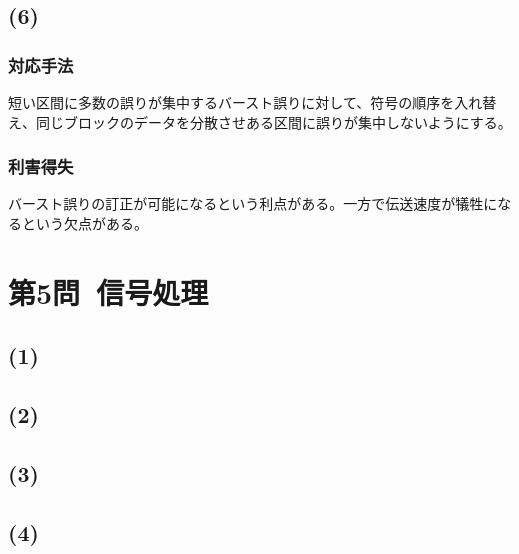 \documentclass[a4paper,12pt,xelatex,ja=standard]{bxjsarticle}
\begin{document}
\subsection*{(6)}
\subsubsection*{対応手法}
短い区間に多数の誤りが集中するバースト誤りに対して、符号の順序を入れ替え、同じブロックのデータを分散させある区間に誤りが集中しないようにする。

\subsubsection*{利害得失}
バースト誤りの訂正が可能になるという利点がある。一方で伝送速度が犠牲になるという欠点がある。

\section*{第5問\ 信号処理}
\subsection*{(1)}

\subsection*{(2)}

\subsection*{(3)}

\subsection*{(4)}
\end{document}
